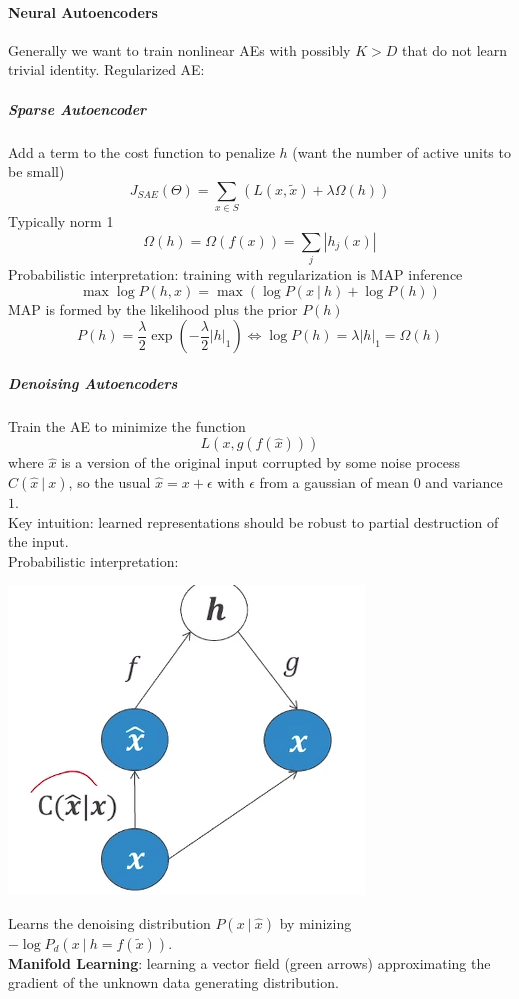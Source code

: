 \documentclass[10pt]{report}
\begin{document}
\paragraph{Neural Autoencoders} Generally we want to train nonlinear AEs with possibly $K > D$ that do not learn trivial identity. Regularized AE:
\subparagraph{Sparse Autoencoder} Add a term to the cost function to penalize $h$ (want the number of active units to be small)
$$J_{SAE}(\Theta) = \sum_{x\in S} (L(x, \tilde{x}) + \lambda\Omega(h))$$
Typically norm 1
$$\Omega(h) = \Omega(f(x)) = \sum_j|h_j(x)|$$
Probabilistic interpretation: training with regularization is MAP inference
$$\max\log P(h,x)=\max(\log P(x\:|\:h)+\log P(h))$$
MAP is formed by the likelihood plus the prior $P(h)$
$$P(h)=\frac{\lambda}{2}\exp\left(-\frac{\lambda}{2}|h|_1\right) \Leftrightarrow \log P(h) = \lambda|h|_1 = \Omega(h)$$
\subparagraph{Denoising Autoencoders} Train the AE to minimize the function $$L(x,g(f(\hat{x})))$$
where $\hat{x}$ is a version of the original input corrupted by some noise process $C(\hat{x}\:|\:x)$, so the usual $\hat{x} = x + \epsilon$ with $\epsilon$ from a gaussian of mean $0$ and variance $1$.\\
Key intuition: learned representations should be robust to partial destruction of the input.\\
Probabilistic interpretation:\begin{center}
	\includegraphics[scale=0.5]{76.png}
\end{center}
Learns the denoising distribution $P(x\:|\:\hat{x})$ by minizing $-\log P_d(x\:|\:h=f(\tilde{x}))$.\\
\textbf{Manifold Learning}: learning a vector field (green arrows) approximating the gradient of the unknown data generating distribution.
\end{document}
